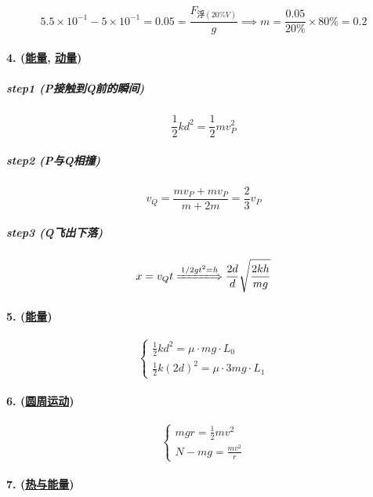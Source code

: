 \begin{equation*}
    5.5\times10^{-1}-5\times10^{-1}=0.05=\frac{F_{\textrm{浮}(20\%V)}}{g}\implies
    m=\frac{0.05}{20\%}\times80\%=0.2
\end{equation*}

\paragraph{4. (\hyperref[subsec:能量]{能量}, \hyperref[subsec:动量]{动量})}

\subparagraph{step1 (P接触到Q前的瞬间)}
\begin{equation*}
    \frac12kd^2=\frac12mv_P^2
\end{equation*}

\subparagraph{step2 (P与Q相撞)}
\begin{equation*}
    v_Q=\frac{mv_P+mv_P}{m+2m}=\frac23v_P
\end{equation*}

\subparagraph{step3 (Q飞出下落)}
\begin{equation*}
    x=v_Qt\xLongrightarrow{1/2gt^2=h}\frac{2d}{d}\sqrt{\frac{2kh}{mg}}
\end{equation*}

\paragraph{5. (\hyperref[subsec:能量]{能量})}

\begin{equation*}
    \begin{cases}
        \frac12kd^2=\mu\cdot mg\cdot L_0\\
        \frac12k(2d)^2=\mu\cdot3mg\cdot L_1
    \end{cases}
\end{equation*}

\paragraph{6. (\hyperref[subsec:圆周运动]{圆周运动})}

\begin{equation*}
    \begin{cases}
        mgr=\frac12mv^2\\
        N-mg=\frac{mv^2}{r}
    \end{cases}
\end{equation*}

\paragraph{7. (\hyperref[sec:热与能量]{热与能量})}


